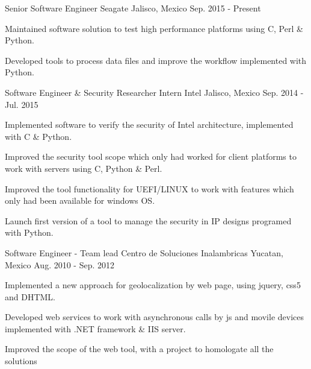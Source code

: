 


\begin{cventries}


\cventry
{Senior Software Engineer} %
{Seagate} %
{Jalisco, Mexico} %
{Sep. 2015 - Present } %
{ %
\begin{cvitems}
\item {Maintained software solution to test high performance platforms using C, Perl \& Python.}
\item {Developed tools to process data files and improve the workflow implemented 
with Python.}
\end{cvitems}
}


\cventry
{Software Engineer \& Security Researcher Intern} %
{Intel} %
{Jalisco, Mexico} %
{Sep. 2014 -  Jul. 2015} %
{ %
\begin{cvitems}
\item {Implemented software to verify the security of Intel architecture, implemented with C \& Python.}
\item {Improved the security tool scope which only had worked for client platforms to work with servers using C, Python \& Perl.}
\item {Improved the tool functionality for UEFI/LINUX to work with features which only had been available for windows OS.}
\item {Launch first version of a tool to manage the security in IP designs programed with Python.}
\end{cvitems}
}


\cventry
{Software Engineer - Team lead } %
{Centro de Soluciones Inalambricas} %
{Yucatan, Mexico} %
{Aug. 2010 - Sep. 2012} %
{ %
\begin{cvitems}
\item {Implemented a new approach for geolocalization by web page, using jquery, css5 and DHTML.}
\item {Developed web services to work with asynchronous calls by js and movile devices implemented with .NET framework \& IIS server.}
\item {Improved the scope of the web tool, with a project to homologate all the solutions}
\end{cvitems} 
}


\end{cventries}
